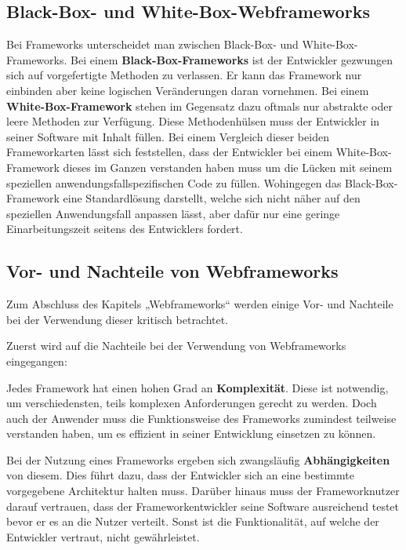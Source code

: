 \subsection{Black-Box- und White-Box-Webframeworks}\label{sec:FWTypen}

Bei Frameworks unterscheidet man zwischen Black-Box- und White-Box-Frameworks. Bei einem \textbf{Black-Box-Frameworks} ist der Entwickler gezwungen sich auf vorgefertigte Methoden zu verlassen. Er kann das Framework nur einbinden aber keine logischen Veränderungen daran vornehmen. Bei einem \textbf{White-Box-Framework} stehen im Gegensatz dazu oftmals nur abstrakte oder leere Methoden zur Verfügung. Diese Methodenhülsen muss der Entwickler in seiner Software mit Inhalt füllen. Bei einem Vergleich dieser beiden Frameworkarten lässt sich feststellen, dass der Entwickler bei einem White-Box-Framework dieses im Ganzen verstanden haben muss um die Lücken mit seinem speziellen anwendungsfallspezifischen Code zu füllen. Wohingegen das Black-Box-Framework eine Standardlösung darstellt, welche sich nicht näher auf den speziellen Anwendungsfall anpassen lässt, aber dafür nur eine geringe Einarbeitungszeit seitens des Entwicklers fordert.\autocites[vgl.][2]{Kojarski2006}

\subsection{Vor- und Nachteile von Webframeworks}

Zum Abschluss des Kapitels „Webframeworks“ werden einige Vor- und Nachteile bei der Verwendung dieser kritisch betrachtet. 

Zuerst wird auf die Nachteile bei der Verwendung von Webframeworks eingegangen:

Jedes Framework hat einen hohen Grad an \textbf{Komplexität}. Diese ist notwendig, um verschiedensten, teils komplexen Anforderungen gerecht zu werden. Doch auch der Anwender muss die Funktionsweise des Frameworks zumindest teilweise verstanden haben, um es effizient in seiner Entwicklung einsetzen zu können.

Bei der Nutzung eines Frameworks ergeben sich zwangsläufig \textbf{Abhängigkeiten} von diesem. Dies führt dazu, dass der Entwickler sich an eine bestimmte vorgegebene Architektur halten muss. Darüber hinaus muss der Frameworknutzer darauf vertrauen, dass der Frameworkentwickler seine Software ausreichend testet bevor er es an die Nutzer verteilt. Sonst ist die Funktionalität, auf welche der Entwickler vertraut, nicht gewährleistet.

